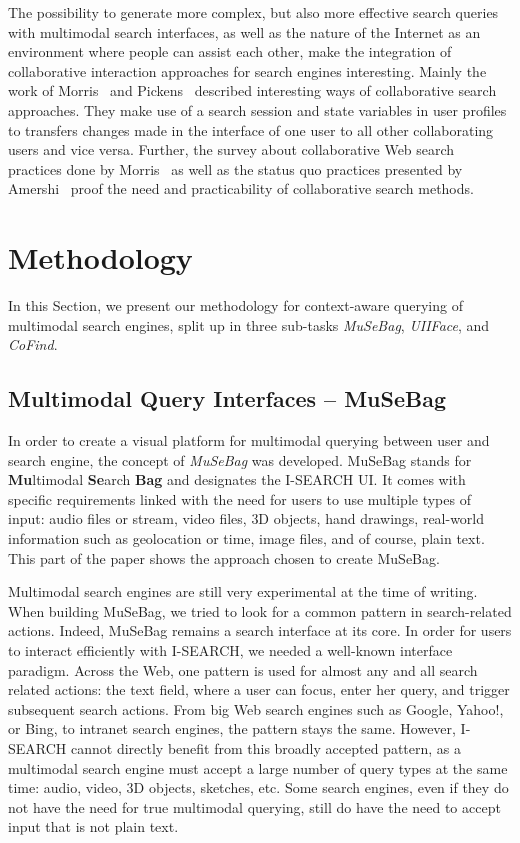 \documentclass[runningheads,a4paper]{llncs} \usepackage[utf8]{inputenc}
\begin{document}
The possibility to generate more complex, but also more effective search queries with multimodal search interfaces, as well as the nature of the Internet as an environment where people can assist each other, make the integration of
collaborative interaction approaches for search engines interesting. Mainly the work of Morris~\cite{morris2007} and Pickens~\cite{pickens2008} described interesting ways of collaborative search approaches. They make use of a search
session and state variables in user profiles to transfers changes made in the interface of one user to all other collaborating users and vice versa. Further, the survey about collaborative Web search practices done by Morris~\cite{morris2008} as well as the status quo practices presented by Amershi~\cite{amershi2009} proof the need and practicability of collaborative search methods.

\section{Methodology}
In this Section, we present our methodology for context-aware querying of multimodal search engines, split up in three sub-tasks \emph{MuSeBag}, \emph{UIIFace}, and \emph{CoFind}.

\subsection{Multimodal Query Interfaces -- MuSeBag}
In order to create a visual platform for multimodal querying between user and search engine, the concept of \emph{MuSeBag} was developed. MuSeBag stands for \textbf{Mu}ltimodal \textbf{Se}arch \textbf{Bag} and designates the \mbox{I-SEARCH} UI. It comes with specific requirements linked with the need for users to use multiple types of input: audio files or stream, video files, 3D objects, hand drawings, real-world information such as geolocation or time, image files, and of course, plain text. This part of the paper shows the approach chosen to create MuSeBag.

Multimodal search engines are still very experimental at the time of writing. When building MuSeBag, we tried to look for a common pattern in search-related actions. Indeed, MuSeBag remains a search interface at its core. In order for users to interact efficiently with \mbox{I-SEARCH}, we needed a well-known interface paradigm. Across the Web, one pattern is used for almost any and all search related actions: the text field, where a user can focus, enter her query, and trigger subsequent search actions. From big Web search engines such as Google, Yahoo!, or Bing, to intranet search engines, the pattern stays the same. However, \mbox{I-SEARCH} cannot directly benefit from this broadly accepted pattern, as a multimodal search engine must accept a large number of query types at the same time: audio, video, 3D objects, sketches, etc. Some search engines, even if they do not have the need for true multimodal querying, still do have the need to accept input that is not plain text.
\end{document}
